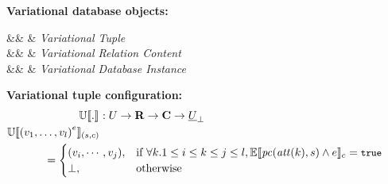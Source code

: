 \begin{figure}
%
\textbf{Variational database objects:}
\begin{syntax}
%
\synDef \vTuple \vRelCont &\eqq&  & \textit{Variational Tuple}\\
\synDef \vRelCont \vRelContSet &\eqq& \setDef {\vi \vTuple \numTuples} & \textit{Variational Relation Content}\\
\synDef \vdbInst \vdbInstSet &\eqq& \annot [\dimMeta] {\setDef {\vi \vTab \numRels} } & \textit{Variational Database Instance}
\end{syntax}

\medskip
\textbf{Variational tuple configuration:}
%
\begin{alignat*}{1}%
\ouSemType [] . &: \vRelCont \to \vRelSchSet \to \confSet \to \maybe \pRelCont\\
%
\ouSem{\vRelSch} {\annot  {\left( {\vi v \numAtts}\right)}}  &\\
& \hspace{-50pt} = \begin{cases}
(v_i, \cdots, v_j), &\If \forall k. 1 \leq i \leq k \leq j \leq l, \fSem {\getPCfrom {\getAtt {k}} \vRelSch \wedge \dimMeta} = \t\\
\bot, &\Otherwise
\end{cases}
\end{alignat*}


\end{figure}
